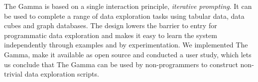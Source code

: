 \documentclass[manuscript,review,anonymous]{acmart}
\begin{document}
The Gamma is based on a single interaction principle, \emph{iterative prompting}. It can be used to
complete a range of data exploration tasks using tabular data, data cubes and graph databases.
The design lowers the barrier to entry for programmatic data exploration and makes it easy to learn
the system independently through examples and by experimentation. We implemented The Gamma, make it
available as open source and conducted a user study, which lets us conclude that
The Gamma can be used by non-programmers to construct non-trivial data exploration scripts.



\end{document}
